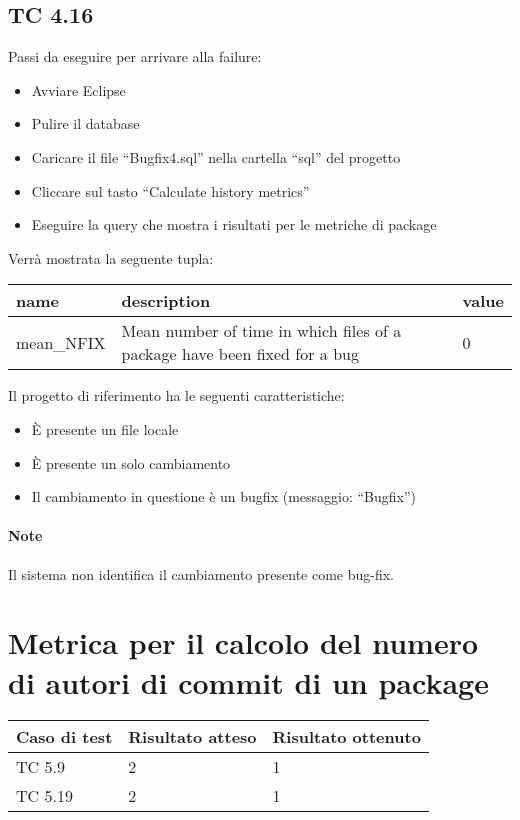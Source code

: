 \subsection*{TC 4.16}
Passi da eseguire per arrivare alla failure:
\begin{itemize}
 \item Avviare Eclipse
 \item Pulire il database
 \item Caricare il file ``Bugfix4.sql'' nella cartella ``sql'' del progetto
 \item Cliccare sul tasto ``Calculate history metrics''
 \item Eseguire la query che mostra i risultati per le metriche di package
\end{itemize}
Verrà mostrata la seguente tupla:
\begin{table}[ht]
 \centering
 \footnotesize
 \begin{tabular}{|l|p{8cm}|l|}
  \hline
  \textbf{name}		& \textbf{description}		& \textbf{value}		\\
  \hline
  mean\_NFIX		& Mean number of time in which files of a package have been fixed for a bug	& 	0 \\
  \hline
 \end{tabular} 
\end{table}
\vspace{0.5cm}
\newline
Il progetto di riferimento ha le seguenti caratteristiche:
\begin{itemize}
 \item È presente un file locale
 \item È presente un solo cambiamento
 \item Il cambiamento in questione è un bugfix (messaggio: ``Bugfix'')
\end{itemize}

\paragraph{Note} Il sistema non identifica il cambiamento presente come bug-fix.
\newpage



\section{Metrica per il calcolo del numero di autori di commit di un package}
\begin{table}[ht]
	\centering
	\begin{tabular}{| l | l | l |}
		\hline
		\rowcolor{lightgray}\textbf{Caso di test}	&	\textbf{Risultato atteso}	&	\textbf{Risultato ottenuto}	\\
		\hline
		TC 5.9						&	2				&	1			   	\\
		\hline
		TC 5.19						&	2				&	1			   	\\
		\hline
	\end{tabular}
\end{table}

